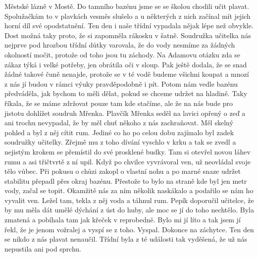
Městské lázně v Mostě. Do tamního bazénu jsme se se školou chodili
učit plavat. Spolužačkám to v plavkách vesměs slušelo a u některých z
nich začínal mít jejich horní díl své opodstatnění. Ten den i naše
třídní vypadala nějak lépe než obvykle. Dost možná taky proto, že si
zapomněla rákosku v šatně. Soudružka učitelka nás nejprve pod hrozbou
třídní důtky varovala, že do vody nesmíme za žádných okolností močit,
protože od toho jsou tu záchody. Na Adamovu otázku zda se zákaz týká i
velké potřeby, jen obrátila oči v sloup. Pak ještě dodala, že se snad
žádné takové čuně nenajde, protože se v té vodě budeme všichni koupat
a mnozí z nás jí budou v rámci výuky pravděpodobně i pít. Potom nám
vedle bazénu předváděla, jak bychom to měli dělat, pokud se chceme
udržet na hladině. Taky říkala, že se máme zdržovat pouze tam kde
stačíme, ale že na nás bude pro jistotu dohlížet soudruh Mřenka.
Plavčík Mřenka seděl na lavici opřený o zeď a ani trochu nevypadal,
že by měl chuť někoho z nás zachraňovat. Měl skelný pohled a byl z
něj cítit rum. Jediné co ho po celou dobu zajímalo byl zadek soudružky
učitelky. Zřejmě mu z toho dívání vyschlo v krku a tak se zvedl a
nejistým krokem se přemístil do své prosklené budky. Tam si otevřel
novou láhev rumu a asi třičtvrtě z ní upil. Když po chvilce vyvrávoral
ven, už neovládal svoje tělo vůbec. Při pokusu o chůzi zakopl o
vlastní nohu a po marné snaze udržet stabilitu přepadl přes okraj
bazénu. Přestože to bylo na straně kde byl jen metr vody, začal se
topit. Okamžitě nás za ním několik naskákalo a podařilo se nám ho
vyvalit ven. Ležel tam, tekla z něj voda a táhnul rum. Pepík doporučil
učitelce, že by mu měla dát umělé dýchání z úst do huby, ale moc se jí
do toho nechtělo. Byla zmatená a pobíhala tam jak křeček v reprobedně.
Bylo mi jí líto a tak jsem jí řekl, že je jenom vožralej a vyspí
se z toho. Vyspal. Dokonce na záchytce. Ten den se nikdo z nás
plavat nenaučil. Třídní byla z té události tak vyděšená, že už nás
nepustila ani pod sprchu.
